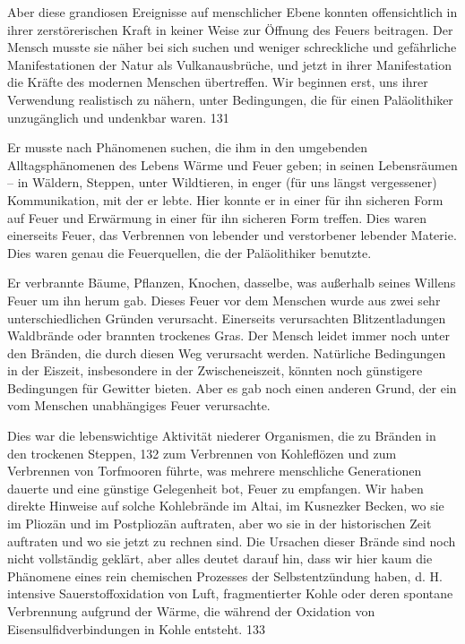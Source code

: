 \documentclass[11pt,a4paper]{book}
\begin{document}
Aber diese grandiosen Ereignisse auf menschlicher Ebene konnten offensichtlich in ihrer zerstörerischen Kraft in keiner Weise zur Öffnung des Feuers beitragen. Der Mensch musste sie näher bei sich suchen und weniger schreckliche und gefährliche Manifestationen der Natur als Vulkanausbrüche, und jetzt in ihrer Manifestation die Kräfte des modernen Menschen übertreffen. Wir beginnen erst, uns ihrer Verwendung realistisch zu nähern, unter Bedingungen, die für einen Paläolithiker unzugänglich und undenkbar waren. 131



Er musste nach Phänomenen suchen, die ihm in den umgebenden Alltagsphänomenen des Lebens Wärme und Feuer geben; in seinen Lebensräumen -- in Wäldern, Steppen, unter Wildtieren, in enger (für uns längst vergessener) Kommunikation, mit der er lebte. Hier konnte er in einer für ihn sicheren Form auf Feuer und Erwärmung in einer für ihn sicheren Form treffen. Dies waren einerseits Feuer, das Verbrennen von lebender und verstorbener lebender Materie. Dies waren genau die Feuerquellen, die der Paläolithiker benutzte.



Er verbrannte Bäume, Pflanzen, Knochen, dasselbe, was außerhalb seines Willens Feuer um ihn herum gab. Dieses Feuer vor dem Menschen wurde aus zwei sehr unterschiedlichen Gründen verursacht. Einerseits verursachten Blitzentladungen Waldbrände oder brannten trockenes Gras. Der Mensch leidet immer noch unter den Bränden, die durch diesen Weg verursacht werden. Natürliche Bedingungen in der Eiszeit, insbesondere in der Zwischeneiszeit, könnten noch günstigere Bedingungen für Gewitter bieten. Aber es gab noch einen anderen Grund, der ein vom Menschen unabhängiges Feuer verursachte.



Dies war die lebenswichtige Aktivität niederer Organismen, die zu Bränden in den trockenen Steppen, 132 zum Verbrennen von Kohleflözen und zum Verbrennen von Torfmooren führte, was mehrere menschliche Generationen dauerte und eine günstige Gelegenheit bot, Feuer zu empfangen. Wir haben direkte Hinweise auf solche Kohlebrände im Altai, im Kusnezker Becken, wo sie im Pliozän und im Postpliozän auftraten, aber wo sie in der historischen Zeit auftraten und wo sie jetzt zu rechnen sind. Die Ursachen dieser Brände sind noch nicht vollständig geklärt, aber alles deutet darauf hin, dass wir hier kaum die Phänomene eines rein chemischen Prozesses der Selbstentzündung haben, d. H. intensive Sauerstoffoxidation von Luft, fragmentierter Kohle oder deren spontane Verbrennung aufgrund der Wärme, die während der Oxidation von Eisensulfidverbindungen in Kohle entsteht. 133
\end{document}
